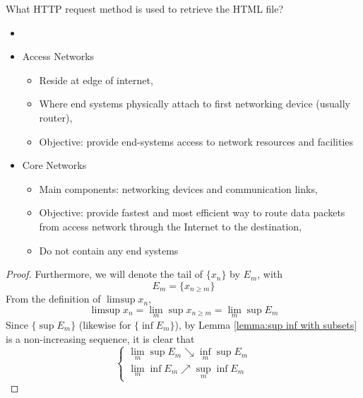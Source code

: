 \documentclass[../../main.tex]{subfiles}
\begin{document}
\providecommand{\xn}{\{x_n\}}
\begin{wts}
What HTTP request method is used to retrieve the HTML file? 
\end{wts}

\begin{wtr}
\begin{itemize}
    \item []
    \item Access Networks
    \begin{itemize}
        \item Reside at edge of internet,
        \item Where end systems physically attach to first networking device (usually router),
        \item Objective: provide end-systems access to network resources and facilities
    \end{itemize}
    \item Core Networks
    \begin{itemize}
        \item Main components: networking devices and communication links,
        \item Objective: provide fastest and most efficient way to route data packets from access network through the Internet to the destination,
        \item Do not contain any end systems
    \end{itemize}
\end{itemize}
\end{wtr}
\begin{proof}
    Furthermore, we will denote the tail of $\xn$ by $E_m$, with
\[
E_m = \{x_{n\geq m}\}
\]
From the definition of $\limsup x_n$,
\[
\limsup x_n = \lim_{m} \sup x_{n\geq m}=\lim_m \sup E_m
\]
Since $\{\sup E_m\}$ (likewise for $\{\inf E_m\}$), by Lemma \ref{lemma:sup inf with subsets} is a non-increasing sequence, it is clear that 
\[
\begin{cases}\lim_m \sup E_m\searrow\inf_m\sup E_m\\\lim_m\inf E_m\nearrow\sup_m\inf E_m
\end{cases}
\]
\end{proof}
\end{document}

